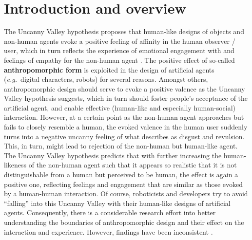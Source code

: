 \documentclass{frontiersSCNS} %
\newcommand{\eg}{{\textit{e.g.~}}}
\begin{document}
\section{Introduction and overview}
\label{sec:intro}

The Uncanny Valley hypothesis \citep{mori_uncanny_1970} proposes that human-like
designs of objects and non-human agents evoke a positive feeling of affinity in
the human observer / user, which in turn reflects the experience of emotional
engagement with and feelings of empathy for the non-human agent
\citep{cheetham_human_2011}. The positive effect of so-called
\textbf{anthropomorphic form} is exploited in the design of artificial agents
(\eg digital characters, robots) for several reasons. Amongst others,
anthropomorphic design should serve to evoke a positive valence as the Uncanny
Valley hypothesis suggests, which in turn should foster people's acceptance of
the artificial agent, and enable effective (human-like and especially
human-social) interaction.  However, at a certain point as the non-human agent
approaches but fails to closely resemble a human, the evoked valence in the
human user suddenly turns into a negative uncanny feeling of what
\cite{mori_uncanny_1970} describes as disgust and revulsion. This, in turn,
might lead to rejection of the non-human but human-like agent.  The Uncanny
Valley hypothesis predicts that with further increasing the human-likeness of
the non-human agent such that it appears so realistic that it is not
distinguishable from a human but perceived to be human, the effect is again a
positive one, reflecting feelings and engagement that are similar as those
evoked by a human-human interaction.  Of course, roboticists and developers try
to avoid ``falling'' into this Uncanny Valley with their human-like designs of
artificial agents. Consequently, there is a considerable research effort into
better understanding the boundaries of anthropomorphic design and their effect
on the interaction and experience. However, findings have been inconsistent
\citep{cheetham_human_2011}.
\end{document}

